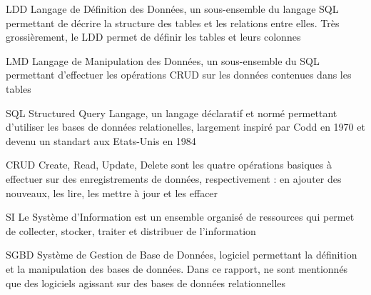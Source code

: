         
        
        {LDD}
        {Langage de Définition des Données, un sous-ensemble du langage SQL permettant de décrire la structure des tables et les relations entre elles. Très grossièrement, le LDD permet de définir les tables et leurs colonnes}

        {LMD}
        {Langage de Manipulation des Données, un sous-ensemble du SQL permettant d'effectuer les opérations CRUD sur les données contenues dans les tables}

        {SQL}
        {Structured Query Langage, un langage déclaratif et normé permettant d'utiliser les bases de données relationelles, largement inspiré par Codd en 1970 et devenu un standart aux Etats-Unis en 1984}

                           {CRUD}
                           {Create, Read, Update, Delete sont les quatre opérations basiques à effectuer sur des enregistrements de données, respectivement : en ajouter des nouveaux, les lire, les mettre à jour et les effacer}

                           {SI}
                           {Le Système d'Information est un ensemble organisé de ressources qui permet de collecter, stocker, traiter et distribuer de l'information}

                           {SGBD}
                           {Système de Gestion de Base de Données, logiciel permettant la définition et la manipulation des bases de données. Dans ce rapport, ne sont mentionnés que des logiciels agissant sur des bases de données relationnelles}

